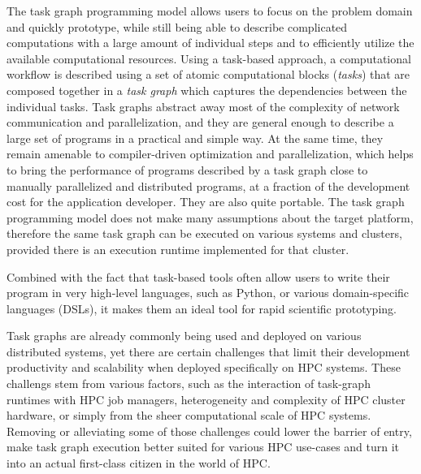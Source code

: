The task graph programming model allows users to focus on the problem domain and quickly prototype,
while still being able to describe complicated computations with a large amount of individual steps
and to efficiently utilize the available computational resources. Using a task-based approach, a
computational workflow is described using a set of atomic computational blocks
(\emph{tasks}) that are composed together in a \emph{task graph} which captures the
dependencies between the individual tasks. Task graphs abstract away most of the complexity of
network communication and parallelization, and they are general enough to describe a large set of
programs in a practical and simple way. At the same time, they remain amenable to compiler-driven
optimization and parallelization, which helps to bring the performance of programs described by a
task graph close to manually parallelized and distributed programs, at a fraction of the
development cost for the application developer. They are also quite portable. The task graph
programming model does not make many assumptions about the target platform, therefore the same task
graph can be executed on various systems and clusters, provided there is an execution runtime
implemented for that cluster.

Combined with the fact that task-based tools often allow users to write their program in very
high-level languages, such as Python, or various domain-specific languages (DSLs), it makes them an
ideal tool for rapid scientific prototyping.

Task graphs are already commonly being used and deployed on various distributed
systems, yet there are certain challenges that limit their development
productivity and scalability when deployed specifically on HPC systems. These challengs stem from
various factors, such as the interaction of task-graph runtimes with HPC job managers,
heterogeneity and complexity of HPC cluster hardware, or simply from the sheer computational scale
of HPC systems. Removing or alleviating some of those challenges could lower the barrier of entry,
make task graph execution better suited for various HPC use-cases and turn it into an actual
first-class citizen in the world of HPC.

